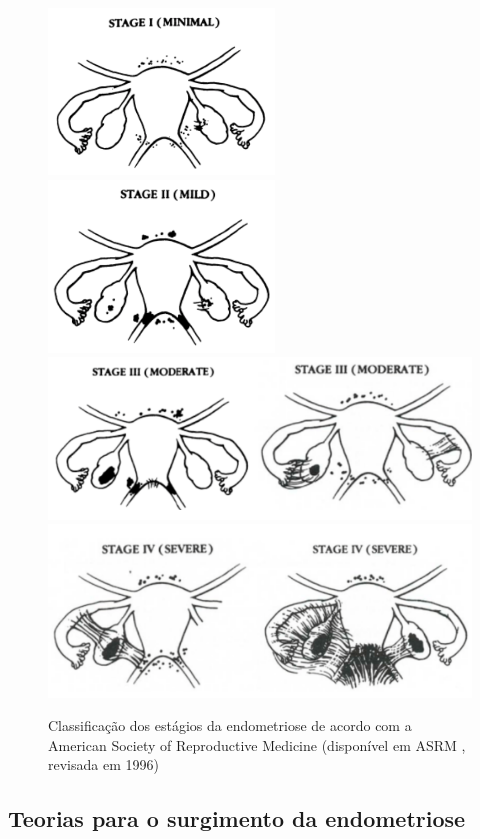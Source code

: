 \documentclass[12pt]{article} %
\begin{document}
\begin{figure}[h!]
\centering
\includegraphics[width=6cm]{stage1.png}
\includegraphics[width=6cm]{stage2.png}
\includegraphics[width=13cm]{stage3.png}
\includegraphics[width=13cm]{stage4.png}
\caption[Classificação dos estagios da endometriose]{ Classificação dos estágios da endometriose de acordo com a American Society of Reproductive Medicine (disponível em ASRM , revisada em 1996) } 
\end{figure} 


\subsection{Teorias para o surgimento da endometriose}
\end{document}
